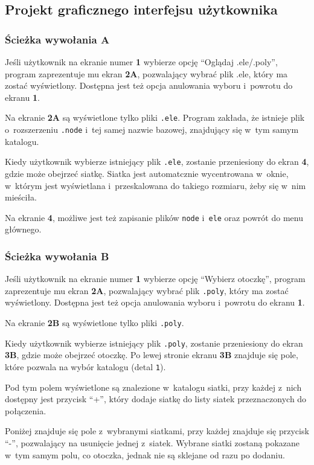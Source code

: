 \documentclass[a4paper]{article}
\begin{document}
\subsection{Projekt graficznego interfejsu użytkownika}
\subsubsection{Ścieżka wywołania A}
Jeśli użytkownik na ekranie numer \textbf{1} wybierze opcję ``Oglądaj .ele/.poly'', program zaprezentuje mu ekran \textbf{2A}, pozwalający wybrać plik .ele, który ma zostać wyświetlony.
Dostępna jest też opcja anulowania wyboru i~powrotu do ekranu \textbf{1}.

Na ekranie \textbf{2A} są wyświetlone tylko pliki \texttt{.ele}. Program zakłada, że istnieje plik o~rozszerzeniu \texttt{.node} i~tej samej nazwie bazowej, znajdujący się w~tym samym katalogu.

Kiedy użytkownik wybierze istniejący plik \texttt{.ele}, zostanie przeniesiony do ekran \textbf{4}, gdzie może obejrzeć siatkę.
Siatka jest automatcznie wycentrowana w~oknie, w~którym jest wyświetlana i~przeskalowana do takiego rozmiaru, żeby się w~nim mieściła.

Na ekranie \textbf{4}, możliwe jest też zapisanie plików \texttt{node} i~\texttt{ele} oraz powrót do menu głównego.

\subsubsection{Ścieżka wywołania B}
Jeśli użytkownik na ekranie numer \textbf{1} wybierze opcję ``Wybierz otoczkę'', program zaprezentuje mu ekran \textbf{2A}, pozwalający wybrać plik \texttt{.poly}, który ma zostać wyświetlony.
Dostępna jest też opcja anulowania wyboru i~powrotu do ekranu \textbf{1}.

Na ekranie \textbf{2B} są wyświetlone tylko pliki \texttt{.poly}.

Kiedy użytkownik wybierze istniejący plik \texttt{.poly}, zostanie przeniesiony do ekran \textbf{3B}, gdzie może obejrzeć otoczkę.
Po lewej stronie ekranu \textbf{3B} znajduje się pole, które pozwala na wybór katalogu (detal \texttt{1}).

Pod tym polem wyświetlone są znalezione w~katalogu siatki, przy każdej z~nich dostępny jest przycisk ``+'', który dodaje siatkę do listy siatek przeznaczonych do połączenia.

Poniżej znajduje się pole z~wybranymi siatkami, przy każdej znajduje się przycisk ``-'', pozwalający na usunięcie jednej z~siatek.
Wybrane siatki zostaną pokazane w~tym samym polu, co otoczka, jednak nie są sklejane od razu po dodaniu.
\end{document}
